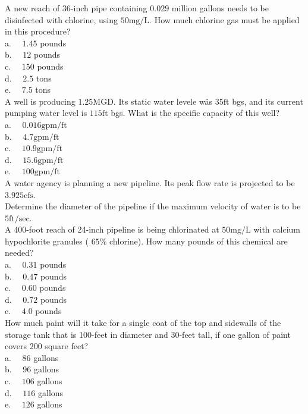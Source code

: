 A new reach of 36-inch pipe containing $0.029$ million gallons needs to be disinfected with chlorine, using $50 \mathrm{mg} / \mathrm{L}$. How much chlorine gas must be applied in this procedure?\\
a. $\quad 1.45$ pounds\\
b. $\quad 12$ pounds\\
c. $\quad 150$ pounds\\
d. $\quad 2.5$ tons\\
e. $\quad 7.5$ tons\\

A well is producing $1.25 \mathrm{MGD}$. Its static water levele wäs $35 \mathrm{ft}$ bgs, and its current pumping water level is $115 \mathrm{ft}$ bgs. What is the specific capacity of this well?\\
a. $\quad 0.016 \mathrm{gpm} / \mathrm{ft}$\\
b. $\quad 4.7 \mathrm{gpm} / \mathrm{ft}$\\
c. $\quad 10.9 \mathrm{gpm} / \mathrm{ft}$\\
d. $\quad 15.6 \mathrm{gpm} / \mathrm{ft}$\\
e. $\quad 100 \mathrm{gpm} / \mathrm{ft}$\\

A water agency is planning a new pipeline. Its peak flow rate is projected to be $3.925 \mathrm{cfs}$.\\
Determine the diameter of the pipeline if the maximum velocity of water is to be $5 \mathrm{ft} / \mathrm{sec}$.\\

A 400-foot reach of 24-inch pipeline is being chlorinated at $50 \mathrm{mg} / \mathrm{L}$ with calcium hypochlorite granules ( $65 \%$ chlorine). How many pounds of this chemical are needed?\\
a. $\quad 0.31$ pounds\\
b. $\quad 0.47$ pounds\\
c. $\quad 0.60$ pounds\\
d. $\quad 0.72$ pounds\\
c. $\quad 4.0$ pounds\\


How much paint will it take for a single coat of the top and sidewalls of the storage tank that is 100-feet in diameter and 30-feet tall, if one gallon of paint covers 200 square feet?\\
a. $\quad 86$ gallons\\
b. $\quad 96$ gallons\\
c. $\quad 106$ gallons\\
d. $\quad 116$ gallons\\
e. $\quad 126$ gallons\\

